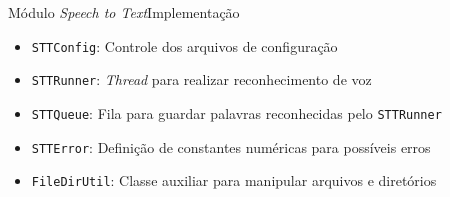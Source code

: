 \begin{frame}{Módulo \textit{Speech to Text}}{Implementação}

\begin{itemize}
\item<2-> \texttt{STTConfig}: Controle dos arquivos de configuração
\item<3-> \texttt{STTRunner}: \textit{Thread} para realizar reconhecimento de voz
\item<4-> \texttt{STTQueue}: Fila para guardar palavras reconhecidas pelo \texttt{STTRunner}
\item<5-> \texttt{STTError}: Definição de constantes numéricas para possíveis erros
\item<6-> \texttt{FileDirUtil}: Classe auxiliar para manipular arquivos e diretórios
\end{itemize}

\end{frame}
